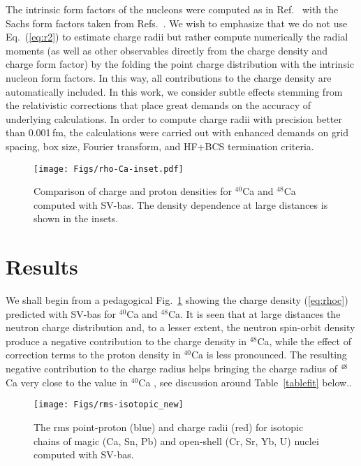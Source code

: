 \documentclass[aps,prc,twocolumn,floatfix,nofootinbib,preprintnumbers,superscriptaddress,longbibliography]{revtex4-1}
\begin{document}
The intrinsic form factors of the nucleons
were computed as in Ref.~\cite{Reinhard2013} with the Sachs form factors 
taken from Refs.~\cite{Simon1980,Walther1986}.
We wish to emphasize that
we do not use Eq.~(\ref{eq:r2}) to estimate charge radii  but rather compute numerically the radial moments (as well as  other observables directly from the charge density and charge form factor)  by the  folding the point charge distribution with the intrinsic nucleon form factors. In this way, all contributions to the charge density are automatically included.
In this work, we consider  subtle effects stemming from the relativistic corrections that place great demands on the accuracy of underlying calculations. In order to compute charge radii with precision better than 0.001\,fm, the calculations were carried out with enhanced demands on grid spacing, box size, Fourier transform, and HF+BCS termination criteria. 

\begin{figure}[htb]
\texttt{[image: Figs/rho-Ca-inset.pdf]}
\caption{Comparison of charge and proton densities for $^{40}$Ca  and $^{48}$Ca computed with SV-bas. The density dependence at large distances is shown in the insets.}
\label{fig:densities}
\end{figure}

\section{Results}\label{sec:Res}

We shall begin  from a pedagogical Fig.~\ref{fig:densities} showing the  charge density (\ref{eq:rhoc})  predicted with SV-bas
for $^{40}$Ca  and $^{48}$Ca. 
It is seen that at large distances the  neutron charge distribution and, to a lesser extent, the neutron spin-orbit density produce a negative contribution to the charge density in $^{48}$Ca,
while the effect of correction terms to the proton density in $^{40}$Ca is less pronounced.
The resulting negative contribution to the charge radius
helps bringing the charge radius of $^{48}$Ca very close to the value in $^{40}$Ca
\cite{Emrich1983,Horowitz2012,Hagen2016,Gar16,Kurasawa2019}, see discussion around Table~\ref{tablefit} below.. 



\begin{figure}[htb]
\texttt{[image: Figs/rms-isotopic\_new]}
\caption{\label{fig:rmsisotopic}
The rms point-proton (blue) and charge radii (red) for  isotopic chains of magic (Ca, Sn, Pb) and open-shell
(Cr, Sr, Yb, U) nuclei computed with SV-bas.
}
\end{figure}
\end{document}

